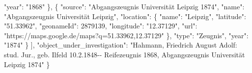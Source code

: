 \documentclass[12pt,a4paper]{article}
\begin{document}
"{}year"{}: "{}1868"{}
\newline
\hspace*{1cm}
\},
\newline
\hspace*{1cm}
\{
\newline
\hspace*{1.5cm}
"{}source"{}: "{}Abgangszeugnis Universität Leipzig 1874"{},
\newline
\hspace*{1.5cm}
"{}name"{}: "{}Abgangszeugnis Universität Leipzig"{},
\newline
\hspace*{1.5cm}
"{}location"{}: \{
\newline
\hspace*{2cm}
"{}name"{}: "{}Leipzig"{},
\newline
\hspace*{2cm}
"{}latitude"{}: "{}51.33962"{},
\newline
\hspace*{2cm}
"{}geonameId"{}: 2879139,
\newline
\hspace*{2cm}
"{}longitude"{}: "{}12.37129"{},
\newline
\hspace*{2cm}
"{}url"{}: "{}https://maps.google.de/maps?q=51.33962,12.37129"{}
\newline
\hspace*{1.5cm}
\},
\newline
\hspace*{1.5cm}
"{}type"{}: "{}Zeugnis"{},
\newline
\hspace*{1.5cm}
"{}year"{}: "{}1874"{}
\newline
\hspace*{1cm}
\}
\newline
\hspace*{0.5cm}
],
\newline
\hspace*{0.5cm}
"{}object\_under\_investigation"{}: "{}Hahmann, Friedrich August Adolf: stud. 
\newline
\hspace*{0.5cm}
Jur., geb. Ilfeld 10.2.1848-{}- Reifezeugnis 1868, Abgangszeugnis Universität
\newline
\hspace*{0.5cm} 
Leipzig 1874"{}
\newline
\}


\end{document}
